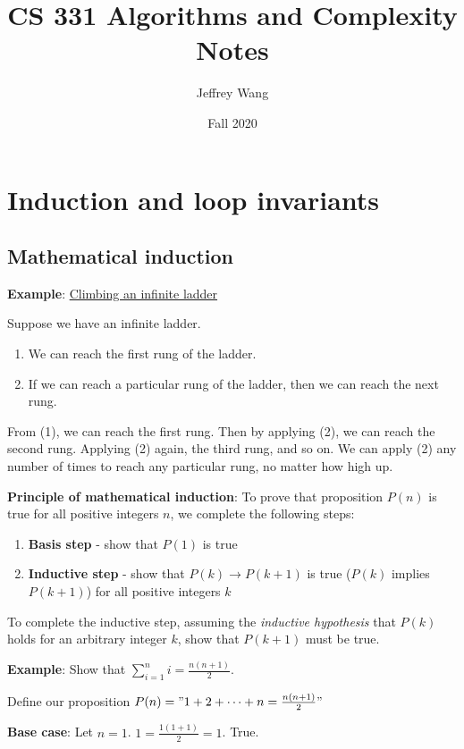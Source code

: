 \documentclass{article}
\title{CS 331 Algorithms and Complexity Notes}
\author{Jeffrey Wang}
\date{Fall 2020}
\begin{document}
\maketitle

\tableofcontents

\newpage

\section{Induction and loop invariants}

\subsection{Mathematical induction}

\textbf{Example}: \underline{Climbing an infinite ladder}

Suppose we have an infinite ladder.
\begin{enumerate}
    \item We can reach the first rung of the ladder.
    \item If we can reach a particular rung of the ladder, then we can reach the next rung.
\end{enumerate}

From (1), we can reach the first rung. Then by applying (2), we can reach the second rung. Applying (2) again, the third rung, and so on. We can apply (2) any number of times to reach any particular rung, no matter how high up.

\textbf{Principle of mathematical induction}: To prove that proposition $P(n)$ is true for all positive integers $n$, we complete the following steps:
\begin{enumerate}
    \item \textbf{Basis step} - show that $P(1)$ is true
    \item \textbf{Inductive step} - show that $P(k) \rightarrow P(k + 1)$ is true ($P(k)$ implies $P(k + 1)$) for all positive integers $k$
\end{enumerate}

To complete the inductive step, assuming the \textit{inductive hypothesis} that $P(k)$ holds for an arbitrary integer $k$, show that $P(k + 1)$ must be true.

\textbf{Example}: Show that $\sum_{i = 1}^n i = \frac{n(n + 1)}{2}$.

Define our proposition $P(n) = "1 + 2 + \dots + n = \frac{n(n + 1)}{2}"$

\textbf{Base case}: Let $n = 1$. $1 = \frac{1(1 + 1)}{2} = 1$. True.
\end{document}
